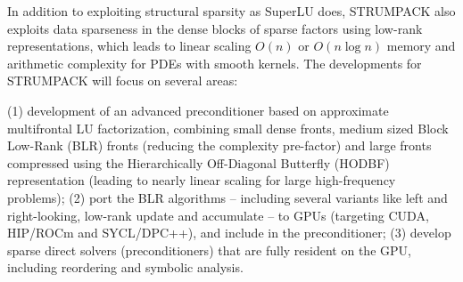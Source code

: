 In addition to exploiting structural sparsity as SuperLU does, STRUMPACK
also exploits data sparseness in the dense blocks of sparse factors using
low-rank representations, which leads to linear scaling $O(n)$ or $O(n \log n)$
memory and arithmetic complexity for PDEs with smooth kernels.
The developments for STRUMPACK will focus on several areas:

(1) development of an advanced preconditioner based on approximate
multifrontal LU factorization, combining small dense fronts, medium
sized Block Low-Rank (BLR) fronts (reducing the complexity pre-factor)
and large fronts compressed using the Hierarchically Off-Diagonal
Butterfly (HODBF) representation (leading to nearly linear scaling for
large high-frequency problems); (2) port the BLR algorithms --
including several variants like left and right-looking, low-rank
update and accumulate -- to GPUs (targeting CUDA, HIP/ROCm and
SYCL/DPC++), and include in the preconditioner;
(3) develop sparse direct solvers (preconditioners) that are fully
resident on the GPU, including reordering and symbolic analysis.

\vspace{-10pt}
